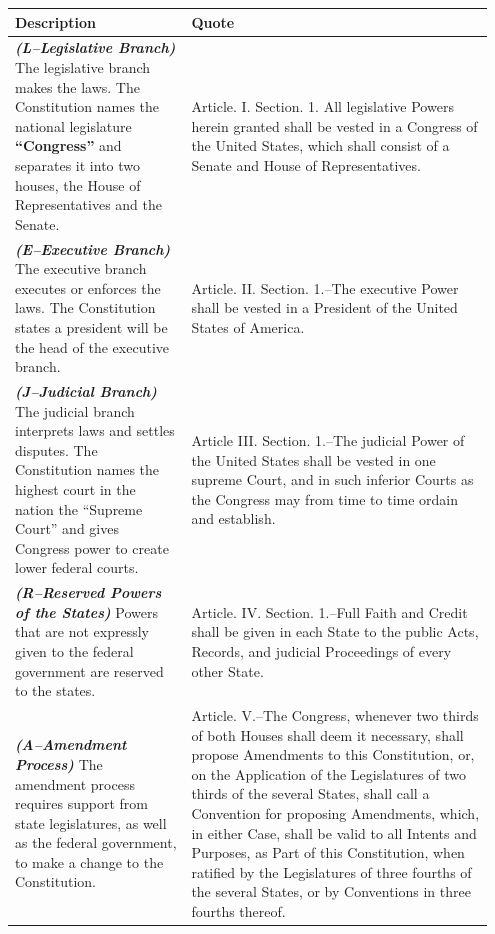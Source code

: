 \begin{center}
	\begin{table}[htbp]
		\begin{tabular}{ p{0.35\linewidth} | p{0.6\linewidth} } 
			\hline
			Description & Quote \\
			\hline
			\textbf{\textit{(L–Legislative Branch)}} The legislative branch makes the laws. The Constitution names the national legislature
			\textbf{“Congress”} and separates it into two houses, the House of Representatives and the Senate. & Article. I. Section. 1.
			All legislative Powers herein granted shall be vested in a Congress of the United States, which shall consist of a Senate and
			House of Representatives. \\ \hline
		    \textbf{\textit{(E–Executive Branch)}} The executive branch executes or enforces the laws. The Constitution states a president
			will be the head of the executive branch. & Article. II. Section. 1.–The executive Power shall be vested in a President of the
			United States of America. \\ \hline
			\textbf{\textit{(J–Judicial Branch)}} The judicial branch interprets laws and settles disputes. The Constitution names the
			highest court in the nation the “Supreme Court” and gives Congress power to create lower federal courts. & Article III.
			Section. 1.–The judicial Power of the United States shall be vested in one supreme Court, and in such inferior Courts as the
			Congress may from time to time ordain and establish. \\ \hline
			\textbf{\textit{(R–Reserved Powers of the States)}} Powers that are not expressly given to the federal government are reserved
			to the states. & Article. IV. Section. 1.–Full Faith and Credit shall be given in each State to the public Acts, Records, and
			judicial Proceedings of every other State. \\ \hline
			\textbf{\textit{(A–Amendment Process)}} The amendment process requires support from state legislatures, as well as the federal
			government, to make a change to the Constitution. & Article. V.–The Congress, whenever two thirds of both Houses shall deem it
			necessary, shall propose Amendments to this Constitution, or, on the Application of the Legislatures of two thirds of the
			several States, shall call a Convention for proposing Amendments, which, in either Case, shall be valid to all Intents and
			Purposes, as Part of this Constitution, when ratified by the Legislatures of three fourths of the several States, or by
			Conventions in three fourths thereof. \\ \hline

\end{tabular}
\end{table}
\end{center}

